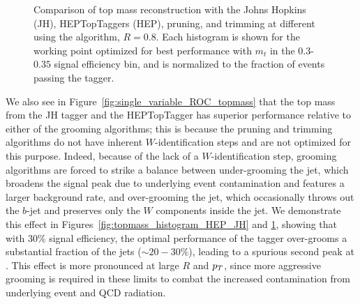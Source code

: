 \begin{figure}
\caption{Comparison of top mass reconstruction with the Johns Hopkins (JH), HEPTopTaggers (HEP), pruning, and trimming at different \pt using the \antikt algorithm, $R=0.8$. Each histogram is shown for the working point optimized for best performance with $m_t$ in the $0.3$-$0.35$ signal efficiency bin, and is normalized to the fraction of events passing the tagger.}
\label{fig:topmass_histogram_HEP_JH_pT}
\end{figure}

We also see in Figure~\ref{fig:single_variable_ROC_topmass} that the top mass from the JH tagger and the HEPTopTagger has superior performance relative to either of the grooming algorithms; this is because  the pruning and trimming algorithms do not have inherent $W$-identification steps and are not optimized for this purpose. Indeed, because of the lack of a $W$-identification step, grooming algorithms are forced to strike a balance between under-grooming the jet, which broadens the signal peak due to underlying event contamination and features a larger background rate, and over-grooming the jet, which occasionally throws out the $b$-jet and preserves only the $W$ components inside the jet. We demonstrate this effect in Figures~\ref{fig:topmass_histogram_HEP_JH} and \ref{fig:topmass_histogram_HEP_JH_pT}, showing that with 30\% signal efficiency, the optimal performance of the tagger over-grooms a substantial fraction of the jets ($\sim20-30\%$), leading to a spurious second peak at \wmass. This effect is more pronounced at large $R$ and $p_T$, since more aggressive grooming is required in these limits to combat the increased contamination from underlying event and QCD radiation. 


